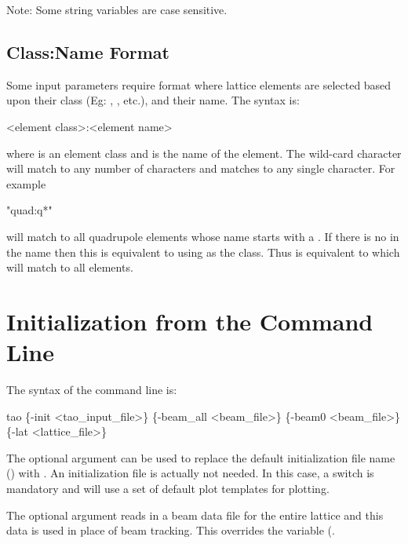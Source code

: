 Note: Some \tao string variables are case sensitive.

\subsection{Class:Name Format}
\label{s:class:name}

Some input parameters require  format where lattice
elements are selected based upon their class (Eg: ,
, etc.), and their name. The syntax is:
\begin{example}
  <element class>:<element name>
\end{example}
where  is an element class and 
is the name of the element.  The wild-card character  will match
to any number of characters and  matches to any
single character.  For example
\begin{example}
  "quad:q*"
\end{example}
will match to all quadrupole elements whose name starts with a
. If there is no  in the name then this is equivalent
to using  as the class.  Thus  is equivalent to
 which will match to all elements.

\section{Initialization from the Command Line}
\label{s:command.line} 

The syntax of the command line is:
\begin{example}
  tao \{-init <tao_input_file>\} \{-beam_all <beam_file>\} 
                          \{-beam0 <beam_file>\} \{-lat <lattice_file>\}
\end{example}

The  optional argument can be used to replace the default
initialization file name () with .
An initialization file is actually not needed. In this case, a
 switch is mandatory and \tao will use a set of default plot
templates for plotting.

The  optional argument reads in a beam data file for the
entire lattice and this data is used in place of beam tracking. This
overrides the  variable (.


